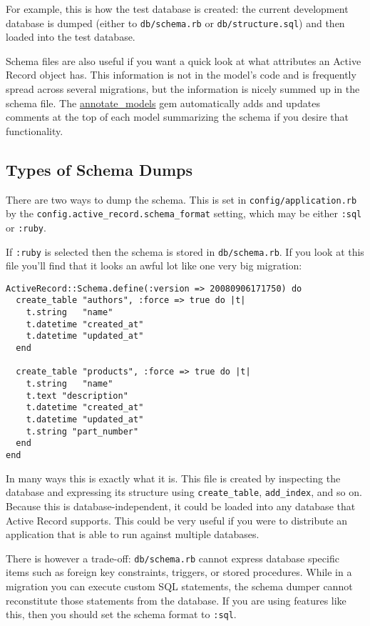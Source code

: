 \documentclass[10pt]{book}
\begin{document}
For example, this is how the test database is created: the current development database is dumped (either to \texttt{db/schema.rb} or \texttt{db/structure.sql}) and then loaded into the test database.

Schema files are also useful if you want a quick look at what attributes an Active Record object has. This information is not in the model’s code and is frequently spread across several migrations, but the information is nicely summed up in the schema file. The \href{https://github.com/ctran/annotate_models}{annotate\_models} gem automatically adds and updates comments at the top of each model summarizing the schema if you desire that functionality.

\subsection{ Types of Schema Dumps}

There are two ways to dump the schema. This is set in \texttt{config/application.rb} by the \texttt{config.active\_record.schema\_format} setting, which may be either \texttt{:sql} or \texttt{:ruby}.

If \texttt{:ruby} is selected then the schema is stored in \texttt{db/schema.rb}. If you look at this file you’ll find that it looks an awful lot like one very big migration:
\begin{verbatim}
ActiveRecord::Schema.define(:version => 20080906171750) do
  create_table "authors", :force => true do |t|
    t.string   "name"
    t.datetime "created_at"
    t.datetime "updated_at"
  end
 
  create_table "products", :force => true do |t|
    t.string   "name"
    t.text "description"
    t.datetime "created_at"
    t.datetime "updated_at"
    t.string "part_number"
  end
end
\end{verbatim}

In many ways this is exactly what it is. This file is created by inspecting the database and expressing its structure using \texttt{create\_table}, \texttt{add\_index}, and so on. Because this is database-independent, it could be loaded into any database that Active Record supports. This could be very useful if you were to distribute an application that is able to run against multiple databases.

There is however a trade-off: \texttt{db/schema.rb} cannot express database specific items such as foreign key constraints, triggers, or stored procedures. While in a migration you can execute custom SQL statements, the schema dumper cannot reconstitute those statements from the database. If you are using features like this, then you should set the schema format to \texttt{:sql}.
\end{document}
